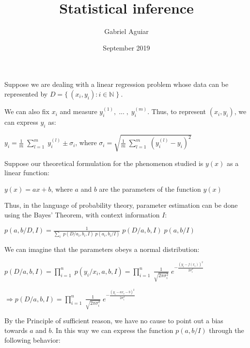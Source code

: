 \documentclass{article}
\title{Statistical inference}
\author{Gabriel Aguiar}
\date{September 2019}
\begin{document}
\maketitle

Suppose we are dealing with a linear regression problem whose data can be represented by $D = \{\ (x_{i},y_{i}) : i \in \mathbb{N} \; \}\ $.

We can also fix $x_{i}$ and measure $y_{i}^{(1)}, \; ... \; , \; y_{i}^{(m)}$. Thus, to represent $(x_{i},y_{i})$, we can express $y_{i}$ as:

\hfill

$y_{i} = \frac{1}{m} \; \sum\limits_{l = 1}^{m} \; y_{i}^{(l)} \pm \sigma_{i}$, where $\sigma_{i} = \sqrt{\frac{1}{m} \; \sum\limits_{l = 1}^{m} \; (y_{i}^{(l)} - y_{i})^{2}}$

\hfill

Suppose our theoretical formulation for the phenomenon studied is $y(x)$ as a linear function:

\hfill

$y(x) = ax + b$, where $a$ and $b$ are the parameters of the function $y(x)$

\hfill

Thus, in the language of probability theory, parameter estimation can be done using the Bayes' Theorem, with context information $I$:

\hfill

$p(a,b/D,I) = \frac{1}{\sum\limits_{i} \; p(D/a_{i},b_{i},I) \; p(a_{i},b_{i}/I)} \; p(D/a,b,I) \; p(a,b/I)$

\hfill

We can imagine that the parameters obeys a normal distribution:

\hfill

$p(D/a,b,I) = \prod\limits_{i = 1}^{n} \; p(y_{i}/x_{i},a,b,I) = \prod\limits_{i = 1}^{n} \; \frac{1}{\sqrt{2 \pi \sigma_{i}^{2}}} \; e^{-\frac{(y_{i} - f(x_{i}))^{2}}{2 \sigma_{i}^{2}}}$

\hfill

$\Rightarrow p(D/a,b,I) = \prod\limits_{i = 1}^{n} \; \frac{1}{\sqrt{2 \pi \sigma_{i}^{2}}} \; e^{-\frac{(y_{i} - ax_{i} - b)^{2}}{2 \sigma_{i}^{2}}}$

\hfill

By the Principle of sufficient reason, we have no cause to point out a bias towards $a$ and $b$. In this way we can express the function $p(a,b/I)$ through the following behavior:

\hfill
\end{document}
